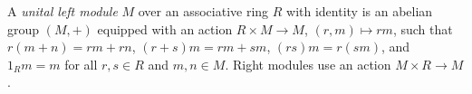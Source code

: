 
A \emph{unital left module} $M$ over an associative ring $R$ with identity is an abelian group $(M,+)$ equipped with an action $R\times M\to M$, $(r,m)\mapsto rm$, such that $r(m+n)=rm+rn$, $(r+s)m=rm+sm$, $(rs)m=r(sm)$, and $1_Rm=m$ for all $r,s\in R$ and $m,n\in M$. Right modules use an action $M\times R\to M$.
